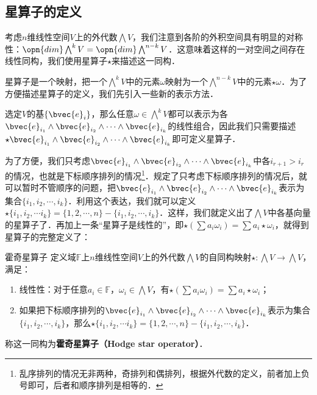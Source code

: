 

\subsection{星算子的定义}

考虑$n$维线性空间$V$上的外代数$\bigwedge V$，我们注意到各阶的外积空间具有明显的对称性：$\opn{dim}\bigwedge^k V=\opn{dim}\bigwedge^{n-k} V$．这意味着这样的一对空间之间存在线性同构，我们使用星算子$\star$来描述这一同构．

星算子是一个映射，把一个$\bigwedge^k V$中的元素$\omega$映射为一个$\bigwedge^{n-k} V$中的元素$\star\omega$．为了方便描述星算子的定义，我们先引入一些新的表示方法．

选定$V$的基$\{\bvec{e}_i\}$，那么任意$\omega\in\bigwedge^k V$都可以表示为各$\bvec{e}_{i_1}\wedge\bvec{e}_{i_2}\wedge\cdots\wedge\bvec{e}_{i_k}$的线性组合，因此我们只需要描述$\star\bvec{e}_{i_1}\wedge\bvec{e}_{i_2}\wedge\cdots\wedge\bvec{e}_{i_k}$即可定义星算子．

为了方便，我们只考虑$\bvec{e}_{i_1}\wedge\bvec{e}_{i_2}\wedge\cdots\wedge\bvec{e}_{i_k}$中各$i_{r+1}>i_r$的情况，也就是下标顺序排列的情况\footnote{乱序排列的情况无非两种，奇排列和偶排列，根据外代数的定义，前者加上负号即可，后者和顺序排列是相等的．}．规定了只考虑下标顺序排列的情况后，就可以暂时不管顺序的问题，把$\bvec{e}_{i_1}\wedge\bvec{e}_{i_2}\wedge\cdots\wedge\bvec{e}_{i_k}$表示为集合$\{i_1, i_2, \cdots, i_k\}$．利用这个表达，我们就可以定义$\star\{i_1, i_2, \cdots i_k\}=\{1, 2, \cdots, n\}-\{i_1, i_2, \cdots, i_k\}$．这样，我们就定义出了$\bigwedge V$中各基向量的星算子了．再加上一条“星算子是线性的”，即$\star(\sum a_i\omega_i)=\sum a_i\star\omega_i$，就得到星算子的完整定义了：

\begin{definition}{霍奇星算子}
定义域$\mathbb{F}$上$n$维线性空间$V$上的外代数$\bigwedge V$的自同构映射$\star:\bigwedge V\to \bigwedge V$，满足：
\begin{enumerate}
\item 线性性：对于任意$a_i\in\mathbb{F}$，$\omega_i\in\bigwedge V$，有$\star(\sum a_i\omega_i)=\sum a_i\star\omega_i$；
\item 如果把下标顺序排列的$\bvec{e}_{i_1}\wedge\bvec{e}_{i_2}\wedge\cdots\wedge\bvec{e}_{i_k}$表示为集合$\{i_1, i_2, \cdots, i_k\}$，那么$\star\{i_1, i_2, \cdots i_k\}=\{1, 2, \cdots, n\}-\{i_1, i_2, \cdots, i_k\}$．
\end{enumerate}
称这一同构为\textbf{霍奇星算子（Hodge star operator）}．
\end{definition}






